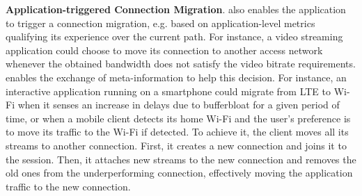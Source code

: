 \textbf{Application-triggered Connection Migration}. \tcpls also enables the
application to trigger a connection migration, e.g. based on application-level 
metrics qualifying its experience over the current path. For instance, a video 
streaming application could choose to move its connection to another access 
network whenever the obtained bandwidth does not satisfy the video bitrate 
requirements.
\tcpls enables the exchange of meta-information to help this
decision.
For instance, an interactive application running on a smartphone could migrate 
from
LTE to Wi-Fi when it senses an increase in delays due to bufferbloat for a
given period of time, or when a mobile client detects its home Wi-Fi and the
user's preference is to move its traffic to the Wi-Fi if detected.
To achieve it, the client moves all its \tcpls streams to another \tcp
connection.
First, it creates a new \tcp connection and joins it to the
\tcpls
session. Then, %
it attaches new streams to the new
connection
and removes the old ones from the underperforming connection, effectively moving
the application traffic to the new connection.


